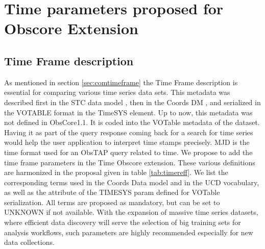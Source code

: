 \documentclass[11pt,a4paper]{ivoa}
\begin{document}
 \section{Time parameters proposed for Obscore Extension }
 \label{sec:timeext}
 
  \subsection{Time Frame description}
  As mentioned in section \ref{sec:comtimeframe} the Time Frame description is essential for comparing various time series data sets.
This metadata was described first in the STC data model  \citep{2007ivoa.spec.1030R}, then  in the Coords DM \citep{2022ivoa.specQ1004R}, and serialized in the  VOTABLE format in the TimeSYS element.
Up to now, this metadata  was not defined in ObsCore1.1. It is coded into the VOTable  metadata of the dataset. 
Having  it as  part of the query response coming back for a search for time series would help the user application to interpret time stamps precisely.
MJD is the time format used for an ObsTAP query related to time. 
We propose to add the time frame parameters in the Time Obscore extension.
These various definitions are harmonized in the proposal given in  table \ref{tab:timereff}. We list the corresponding terms used in the Coords Data model and in the UCD vocabulary, as well as the attribute of the TIMESYS param defined for VOTable serialization. 
All terms are proposed as mandatory, but can be set to UNKNOWN if not available. 
With the expansion of massive time series datasets, where efficient data discovery will serve the selection of big training sets for analysis workflows, 
such parameters are highly recommended especially for new data collections. 
\end{document}
